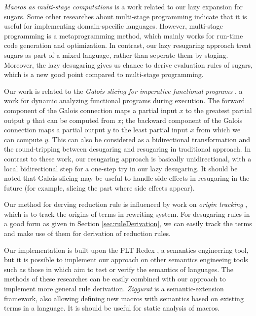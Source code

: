 \emph{Macros as multi-stage computations} \cite{multistage} is a work related to our lazy expansion for sugars. Some other researches \cite{modularstaging} about multi-stage programming \cite{MSP} indicate that it is useful for implementing domain-specific languages. However, multi-stage programming is a metaprogramming method, which mainly works for run-time code generation and optimization. In contrast, our lazy resugaring approach treat sugars as part of a mixed language, rather than seperate them by staging. Moreover, the lazy desugaring gives us chance to derive evaluation rules of sugars, which is a new good point compared to multi-stage programming.

Our work is related to the \emph{Galois slicing for imperative functional programs} \cite{slicing}, a work for dynamic analyzing functional programs during execution. The forward component of the Galois connection maps a partial input $x$ to the greatest partial output $y$ that can be computed from $x$; the backward component of the Galois connection maps a partial output $y$ to the least partial input $x$ from which we can compute $y$.
This can also be considered as a bidirectional transformation \cite{bx,lens07} and the round-tripping between desugaring and resugaring in traditional approach. In contrast to these work, our resugaring approach is basically unidirectional, with a local bidirectional step
for a one-step try in our lazy desugaring. It should be noted that Galois slicing may be useful to handle side effects in resugaring in the future (for example, slicing the part where side effects appear).

Our method for derving reduction rule is influenced by work on \emph{origin tracking} \cite{origintracking}, which is to  track the origins of terms in rewriting system.
For desugaring rules in a good form as given in Section \ref{sec:ruleDerivation}, we can easily track the terms and make use of them for derivation of reduction rules. 
%

Our implementation is built upon the PLT Redex \cite{SEwPR}, a semantics engineering tool, but it is possible to implement our approach on other semantics engineeing tools such as those in \cite{dynsem,Ksemantic} which aim to test or verify the semantics of languages. The methods of these researches can be easily combined with our approach to implement more general rule derivation. \emph{Ziggurat} \cite{Ziggurat} is a semantic-extension framework, also allowing defining new macros with semantics based on existing terms in a language. It is should be useful for static analysis of macros.

